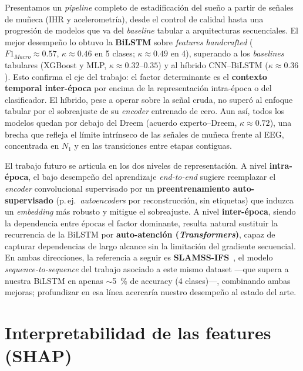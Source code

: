 \documentclass[conference]{IEEEtran}
\begin{document}
Presentamos un \textit{pipeline} completo de estadificación del sueño a partir de señales de muñeca (IHR y acelerometría), desde el control de calidad hasta una progresión de modelos que va del \emph{baseline} tabular a arquitecturas secuenciales. El mejor desempeño lo obtuvo la \textbf{BiLSTM} sobre \textit{features handcrafted} ($F1_{Macro}\approx0.57$, $\kappa\approx0.46$ en 5 clases; $\kappa\approx0.49$ en 4), superando a los \emph{baselines} tabulares (XGBoost y MLP, $\kappa\approx0.32$--$0.35$) y al híbrido CNN--BiLSTM ($\kappa\approx0.36$). Esto confirma el eje del trabajo: el factor determinante es el \textbf{contexto temporal inter-época} por encima de la representación intra-época o del clasificador. El híbrido, pese a operar sobre la señal cruda, no superó al enfoque tabular por el sobreajuste de su \emph{encoder} entrenado de cero. Aun así, todos los modelos quedan por debajo del Dreem (acuerdo experto--Dreem, $\kappa\approx0.72$), una brecha que refleja el límite intrínseco de las señales de muñeca frente al EEG, concentrada en $N_1$ y en las transiciones entre etapas contiguas.

El trabajo futuro se articula en los dos niveles de representación. A nivel \textbf{intra-época}, el bajo desempeño del aprendizaje \emph{end-to-end} sugiere reemplazar el \emph{encoder} convolucional supervisado por un \textbf{preentrenamiento auto-supervisado} (p.\,ej.\ \emph{autoencoders} por reconstrucción, sin etiquetas) que induzca un \emph{embedding} más robusto y mitigue el sobreajuste. A nivel \textbf{inter-época}, siendo la dependencia entre épocas el factor dominante, resulta natural sustituir la recurrencia de la BiLSTM por \textbf{auto-atención (\emph{Transformers})}, capaz de capturar dependencias de largo alcance sin la limitación del gradiente secuencial. En ambas direcciones, la referencia a seguir es \textbf{SLAMSS-IFS}~\cite{slamss-ifs}, el modelo \emph{sequence-to-sequence} del trabajo asociado a este mismo dataset ---que supera a nuestra BiLSTM en apenas $\sim$\qty{5}{\percent} de accuracy (4 clases)---, combinando ambas mejoras; profundizar en esa línea acercaría nuestro desempeño al estado del arte.

\newpage

\appendices

\section{Interpretabilidad de las features (SHAP)}
\end{document}
